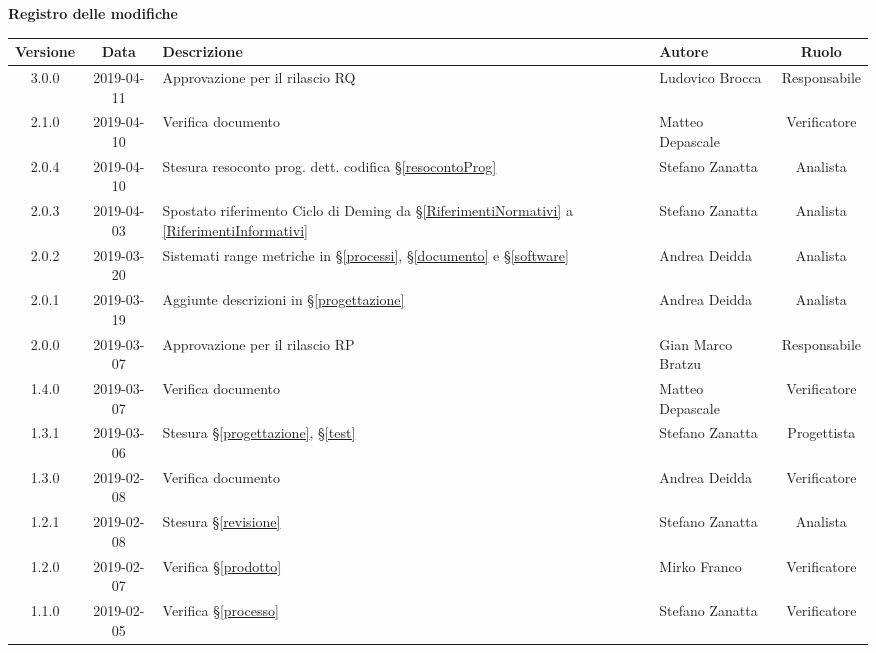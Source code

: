 	\begin{center}
		\textbf{Registro delle modifiche}
	\end{center}
	\begin{center}
		\begin{tabularx}{\textwidth}{|c|c|X|X|c|}
			\hline
			\textbf{Versione} & \textbf{Data} & \textbf{Descrizione} & \textbf{Autore} & \textbf{Ruolo} \\\hline
			\hline
			3.0.0 & 2019-04-11 &  Approvazione per il rilascio RQ & Ludovico Brocca & Responsabile \\
			\hline
			2.1.0 & 2019-04-10 &  Verifica documento & Matteo Depascale & Verificatore \\
			\hline
			2.0.4 & 2019-04-10 &  Stesura resoconto prog. dett. codifica \S\ref{resocontoProg} & Stefano Zanatta & Analista \\
			\hline
			2.0.3 & 2019-04-03 & Spostato riferimento Ciclo di Deming da \S\ref{RiferimentiNormativi} a \ref{RiferimentiInformativi} & Stefano Zanatta & Analista \\
			\hline
			2.0.2 & 2019-03-20 &  Sistemati range metriche in \S\ref{processi}, \S\ref{documento} e \S\ref{software} & Andrea Deidda & Analista \\
			\hline
			2.0.1 & 2019-03-19 &  Aggiunte descrizioni in \S\ref{progettazione} & Andrea Deidda & Analista \\
			\hline
			2.0.0 & 2019-03-07 &  Approvazione per il rilascio RP & Gian Marco Bratzu & Responsabile \\
			\hline
			1.4.0 & 2019-03-07 &  Verifica documento & Matteo Depascale & Verificatore \\
			\hline
			1.3.1 & 2019-03-06 &  Stesura \S\ref{progettazione}, \S\ref{test} & Stefano Zanatta & Progettista \\
			\hline
			1.3.0 & 2019-02-08 &  Verifica documento & Andrea Deidda & Verificatore \\
			\hline
			1.2.1 & 2019-02-08 &  Stesura \S\ref{revisione} & Stefano Zanatta & Analista \\
			\hline
			1.2.0 & 2019-02-07 & Verifica \S\ref{prodotto} & Mirko Franco & Verificatore \\
			\hline
			1.1.0 & 2019-02-05 & Verifica \S\ref{processo}& Stefano Zanatta & Verificatore\\
			\hline

\end{tabularx}
\end{center}
